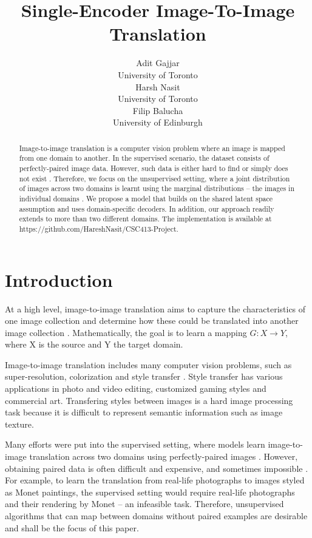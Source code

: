 \documentclass{article}
\title{Single-Encoder Image-To-Image Translation}
\author{%
  Adit Gajjar
  \\
  University of Toronto\\
  \And
  Harsh Nasit \\
  University of Toronto\\
  \And
  Filip Balucha \\
  University of Edinburgh\\
}
\begin{document}
\maketitle

\begin{abstract}
  Image-to-image translation is a computer vision problem where an image is mapped from one domain to another. In the supervised scenario, the dataset consists of perfectly-paired image data. However, such data is either hard to find or simply does not exist \citep{zhu}. Therefore, we focus on the unsupervised setting, where a joint distribution of images across two domains is learnt using the marginal distributions – the images in individual domains \citep{liu}. We propose a model that builds on the shared latent space assumption and uses domain-specific decoders. In addition, our approach readily extends to more than two different domains. The implementation is available at https://github.com/HareshNasit/CSC413-Project.
\end{abstract}

\section{Introduction}
At a high level, image-to-image translation aims to capture the characteristics of one image collection and determine how these could be translated into another image collection \citep{zhu}. Mathematically, the goal is to learn a mapping $G: X \rightarrow Y$, where X is the source and Y the target domain.

Image-to-image translation includes many computer vision problems, such as super-resolution, colorization and style transfer \citep{liu}. Style transfer has various applications in photo and video editing, customized gaming styles and commercial art. Transfering styles between images is a hard image processing task because it is difficult to represent semantic information such as image texture.

Many efforts were put into the supervised setting, where models learn image-to-image translation across two domains using perfectly-paired images \citep{zhu}. However, obtaining paired data is often difficult and expensive, and sometimes impossible \citep{zhu}. For example, to learn the translation from real-life photographs to images styled as Monet paintings, the supervised setting would require real-life photographs and their rendering by Monet – an infeasible task. Therefore, unsupervised algorithms that can map between domains without paired examples are desirable and shall be the focus of this paper.
\end{document}
